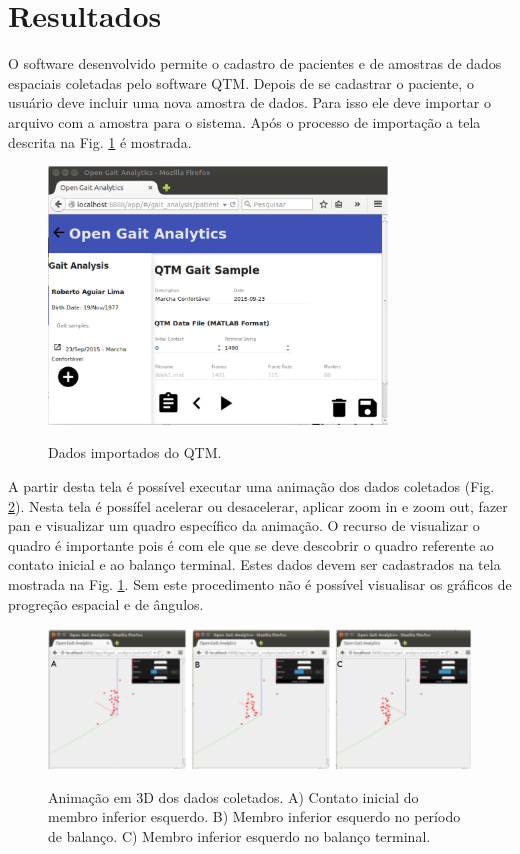 \documentclass[journal]{IEEEtran}
\begin{document}
\section{Resultados}
O software desenvolvido permite o cadastro de pacientes e de amostras de dados espaciais
coletadas pelo software QTM. 
Depois de se cadastrar o paciente, o usuário deve incluir uma nova amostra de dados.
Para isso ele deve importar o arquivo com a amostra para o sistema. Após o processo de 
importação a tela descrita na Fig. \ref{qtm_data} é mostrada.


\begin{figure}[!t]
	\centering
	{\includegraphics[width=9cm]{tela7}}
	\caption{Dados importados do QTM. }
	\label{qtm_data}
\end{figure}


A partir desta tela é possível executar uma animação dos dados coletados (Fig. \ref{animacao}).
Nesta tela é possífel acelerar ou desacelerar, aplicar zoom in e zoom out, fazer pan e visualizar
um quadro específico da animação. O recurso de visualizar o quadro é importante pois é com ele
que se deve descobrir o quadro referente ao contato inicial e ao balanço terminal. Estes
dados devem ser cadastrados na tela mostrada na Fig. \ref{qtm_data}. Sem este procedimento não
é possível visualisar os gráficos de progreção espacial e de ângulos.

\begin{figure}[tb]
	\centering
	{\includegraphics[width=\textwidth]{animacao}}
	\caption{Animação em 3D dos dados coletados. A) Contato inicial
		do membro inferior esquerdo. B) Membro inferior esquerdo no
	período de balanço. C) Membro inferior esquerdo no balanço terminal. }
	\label{animacao}
\end{figure}
\end{document}
